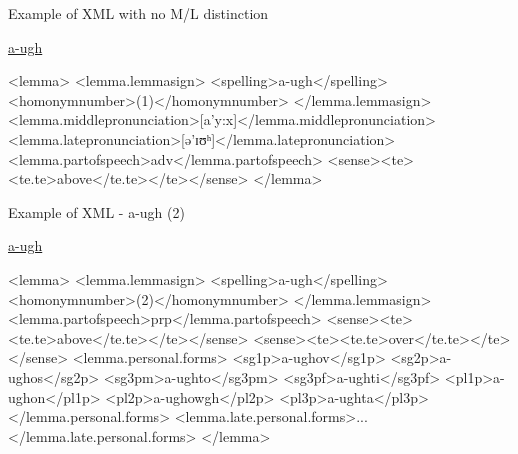 \documentclass[handout]{beamer}
\begin{document}
\begin{frame}[fragile]{Example of XML with no M/L distinction}
\begin{scriptsize}
\href{http://www.cornishdictionary.org.uk/?locale=en#a-ugh}{a-ugh}
\begin{semiverbatim}
\color{gray}
<lemma>
<lemma.lemmasign>
<spelling>{\color{black}a-ugh}</spelling>
<homonymnumber>{\color{black}(1)}</homonymnumber>
</lemma.lemmasign>
<lemma.middlepronunciation>[a'y:x]</lemma.middlepronunciation>
<lemma.latepronunciation>[ə'ɪʊʰ]</lemma.latepronunciation>
<lemma.partofspeech>{\color{black}adv}</lemma.partofspeech>
<sense><te><te.te>{\color{black}above}</te.te></te></sense>
</lemma>
\end{semiverbatim}
\end{scriptsize}
\end{frame}
\begin{frame}[fragile]{Example of XML - a-ugh (2)}
\begin{tiny}
\href{http://www.cornishdictionary.org.uk/?locale=en#a-ugh}{a-ugh}
\begin{semiverbatim}
\color{gray}
<lemma>
<lemma.lemmasign>
<spelling>{\color{black}a-ugh}</spelling>
<homonymnumber>{\color{black}(2)}</homonymnumber>
</lemma.lemmasign>
<lemma.partofspeech>{\color{black}prp}</lemma.partofspeech>
<sense><te><te.te>{\color{black}above}</te.te></te></sense>
<sense><te><te.te>{\color{black}over}</te.te></te></sense>
<lemma.personal.forms>
<sg1p>a-ughov</sg1p>
<sg2p>a-ughos</sg2p>
<sg3pm>a-ughto</sg3pm>
<sg3pf>a-ughti</sg3pf>
<pl1p>a-ughon</pl1p>
<pl2p>a-ughowgh</pl2p>
<pl3p>a-ughta</pl3p>
</lemma.personal.forms>
<lemma.late.personal.forms>...</lemma.late.personal.forms>
</lemma>
\end{semiverbatim}
\end{tiny}
\end{frame}
\end{document}

